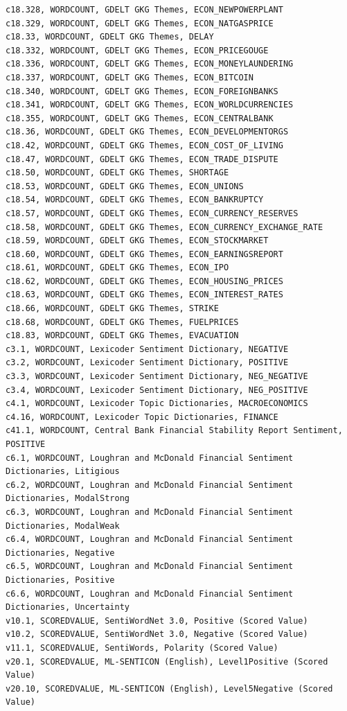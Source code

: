\documentclass[12pt]{article}
\begin{document}
\begin{verbatim}
c18.328, WORDCOUNT, GDELT GKG Themes, ECON_NEWPOWERPLANT
c18.329, WORDCOUNT, GDELT GKG Themes, ECON_NATGASPRICE
c18.33, WORDCOUNT, GDELT GKG Themes, DELAY
c18.332, WORDCOUNT, GDELT GKG Themes, ECON_PRICEGOUGE
c18.336, WORDCOUNT, GDELT GKG Themes, ECON_MONEYLAUNDERING
c18.337, WORDCOUNT, GDELT GKG Themes, ECON_BITCOIN
c18.340, WORDCOUNT, GDELT GKG Themes, ECON_FOREIGNBANKS
c18.341, WORDCOUNT, GDELT GKG Themes, ECON_WORLDCURRENCIES
c18.355, WORDCOUNT, GDELT GKG Themes, ECON_CENTRALBANK
c18.36, WORDCOUNT, GDELT GKG Themes, ECON_DEVELOPMENTORGS
c18.42, WORDCOUNT, GDELT GKG Themes, ECON_COST_OF_LIVING
c18.47, WORDCOUNT, GDELT GKG Themes, ECON_TRADE_DISPUTE
c18.50, WORDCOUNT, GDELT GKG Themes, SHORTAGE
c18.53, WORDCOUNT, GDELT GKG Themes, ECON_UNIONS
c18.54, WORDCOUNT, GDELT GKG Themes, ECON_BANKRUPTCY
c18.57, WORDCOUNT, GDELT GKG Themes, ECON_CURRENCY_RESERVES
c18.58, WORDCOUNT, GDELT GKG Themes, ECON_CURRENCY_EXCHANGE_RATE
c18.59, WORDCOUNT, GDELT GKG Themes, ECON_STOCKMARKET
c18.60, WORDCOUNT, GDELT GKG Themes, ECON_EARNINGSREPORT
c18.61, WORDCOUNT, GDELT GKG Themes, ECON_IPO
c18.62, WORDCOUNT, GDELT GKG Themes, ECON_HOUSING_PRICES
c18.63, WORDCOUNT, GDELT GKG Themes, ECON_INTEREST_RATES
c18.66, WORDCOUNT, GDELT GKG Themes, STRIKE
c18.68, WORDCOUNT, GDELT GKG Themes, FUELPRICES
c18.83, WORDCOUNT, GDELT GKG Themes, EVACUATION
c3.1, WORDCOUNT, Lexicoder Sentiment Dictionary, NEGATIVE
c3.2, WORDCOUNT, Lexicoder Sentiment Dictionary, POSITIVE
c3.3, WORDCOUNT, Lexicoder Sentiment Dictionary, NEG_NEGATIVE
c3.4, WORDCOUNT, Lexicoder Sentiment Dictionary, NEG_POSITIVE
c4.1, WORDCOUNT, Lexicoder Topic Dictionaries, MACROECONOMICS
c4.16, WORDCOUNT, Lexicoder Topic Dictionaries, FINANCE
c41.1, WORDCOUNT, Central Bank Financial Stability Report Sentiment, POSITIVE
c6.1, WORDCOUNT, Loughran and McDonald Financial Sentiment Dictionaries, Litigious
c6.2, WORDCOUNT, Loughran and McDonald Financial Sentiment Dictionaries, ModalStrong
c6.3, WORDCOUNT, Loughran and McDonald Financial Sentiment Dictionaries, ModalWeak
c6.4, WORDCOUNT, Loughran and McDonald Financial Sentiment Dictionaries, Negative
c6.5, WORDCOUNT, Loughran and McDonald Financial Sentiment Dictionaries, Positive
c6.6, WORDCOUNT, Loughran and McDonald Financial Sentiment Dictionaries, Uncertainty
v10.1, SCOREDVALUE, SentiWordNet 3.0, Positive (Scored Value)
v10.2, SCOREDVALUE, SentiWordNet 3.0, Negative (Scored Value)
v11.1, SCOREDVALUE, SentiWords, Polarity (Scored Value)
v20.1, SCOREDVALUE, ML-SENTICON (English), Level1Positive (Scored Value)
v20.10, SCOREDVALUE, ML-SENTICON (English), Level5Negative (Scored Value)

\end{verbatim}
\end{document}

